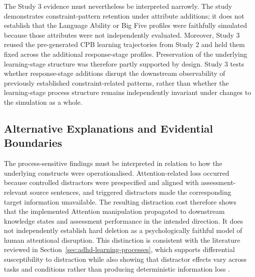 The Study 3 evidence must nevertheless be interpreted narrowly. The study demonstrates constraint-pattern retention under attribute additions; it does not establish that the Language Ability or Big Five profiles were faithfully simulated because those attributes were not independently evaluated. Moreover, Study 3 reused the pre-generated CPB learning trajectories from Study 2 and held them fixed across the additional response-stage profiles. Preservation of the underlying learning-stage structure was therefore partly supported by design. Study 3 tests whether response-stage additions disrupt the downstream observability of previously established constraint-related patterns, rather than whether the learning-stage process structure remains independently invariant under changes to the simulation as a whole.

\subsection{Alternative Explanations and Evidential Boundaries}

The process-sensitive findings must be interpreted in relation to how the underlying constructs were operationalised. Attention-related loss occurred because controlled distractors were prespecified and aligned with assessment-relevant source sentences, and triggered distractors made the corresponding target information unavailable. The resulting distraction cost therefore shows that the implemented Attention manipulation propagated to downstream knowledge states and assessment performance in the intended direction. It does not independently establish hard deletion as a psychologically faithful model of human attentional disruption. This distinction is consistent with the literature reviewed in Section~\ref{sec:adhd-learning-processes}, which supports differential susceptibility to distraction while also showing that distractor effects vary across tasks and conditions rather than producing deterministic information loss \cite{pelham-etal-2011-distractors,schneidt2018distraction,van2007distraction}.

